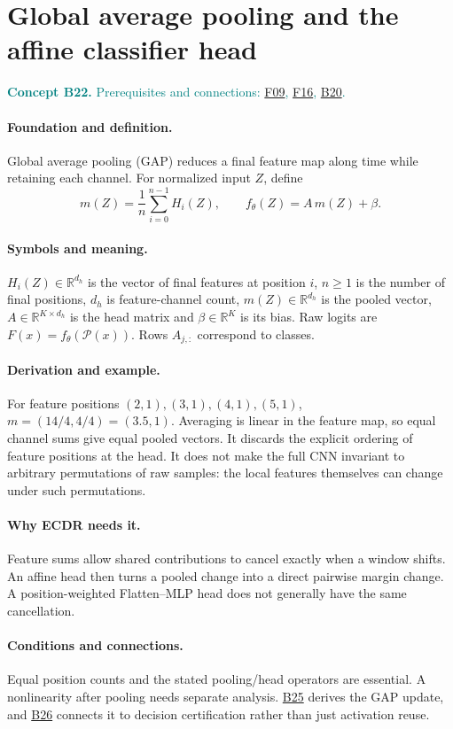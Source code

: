\documentclass[11pt,a4paper]{article}
\newcommand{\R}{\mathbb R}
\newcommand{\conceptid}{Front matter}
\newcommand{\concept}[3]{\clearpage\renewcommand{\conceptid}{#1}%
\section{#2}\label{concept:#1}%
\textcolor{teal}{\textbf{Concept #1.} Prerequisites and connections: #3.}\par
\typeout{ECDR-CONCEPT-START #1 PAGE=\thepage}}
\begin{document}
\concept{B22}{Global average pooling and the affine classifier head}{\hyperref[concept:F09]{F09}, \hyperref[concept:F16]{F16}, \hyperref[concept:B20]{B20}}
\paragraph{Foundation and definition.}
Global average pooling (GAP) reduces a final feature map along time while
retaining each channel. For normalized input $Z$, define
\[
 m(Z)=\frac1n\sum_{i=0}^{n-1}H_i(Z),\qquad
 f_\theta(Z)=A\,m(Z)+\beta.
\]
\paragraph{Symbols and meaning.}
$H_i(Z)\in\R^{d_h}$ is the vector of final features at position $i$,
$n\ge1$ is the number of final positions, $d_h$ is feature-channel count,
$m(Z)\in\R^{d_h}$ is the pooled vector, $A\in\R^{K\times d_h}$ is
the head matrix and $\beta\in\R^K$ is its bias. Raw logits are
$F(x)=f_\theta(\mathcal P(x))$. Rows $A_{j,:}$ correspond to classes.
\paragraph{Derivation and example.}
For feature positions $(2,1),(3,1),(4,1),(5,1)$,
$m=(14/4,4/4)=(3.5,1)$. Averaging is linear in the feature map, so
equal channel sums give equal pooled vectors. It discards the explicit
ordering of feature positions at the head. It does not make the full CNN
invariant to arbitrary permutations of raw samples: the local features
themselves can change under such permutations.
\paragraph{Why ECDR needs it.}
Feature sums allow shared contributions to cancel exactly when a window
shifts. An affine head then turns a pooled change into a direct pairwise
margin change. A position-weighted Flatten--MLP head does not generally
have the same cancellation.
\paragraph{Conditions and connections.}
Equal position counts and the stated pooling/head operators are essential.
A nonlinearity after pooling needs separate analysis. \hyperref[concept:B25]{B25} derives the GAP
update, and \hyperref[concept:B26]{B26} connects it to decision certification rather than just
activation reuse.
\par\label{endconcept:B22}
\end{document}
